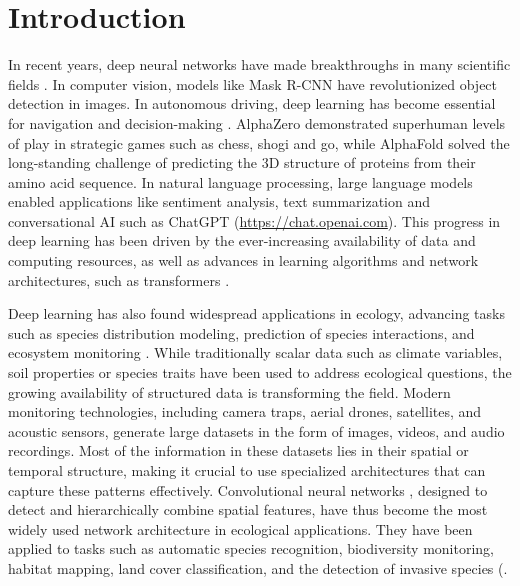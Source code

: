 \documentclass[12pt,twoside]{scrreport}
\begin{document}
\chapter*{Introduction}
\setcounter{page}{1}
In recent years, deep neural networks have made breakthroughs in many scientific fields \citep{jordanMachineLearningTrends2015}. In computer vision, models like Mask R-CNN \citep{heMaskRCNN2017} have revolutionized object detection in images. In autonomous driving, deep learning has become essential for navigation and decision-making \citep{bojarskiEndEndLearning2016}. AlphaZero \citep{silverMasteringChessShogi2017} demonstrated superhuman levels of play in strategic games such as chess, shogi and go, while AlphaFold \citep{jumperHighlyAccurateProtein2021} solved the long-standing challenge of predicting the 3D structure of proteins from their amino acid sequence. In natural language processing, large language models \citep[e.g., GPT-3,][]{brownLanguageModelsAre2020} enabled applications like sentiment analysis, text summarization and conversational AI such as ChatGPT (\url{https://chat.openai.com}). This progress in deep learning has been driven by the ever-increasing availability of data and computing resources, as well as advances in learning algorithms and network architectures, such as transformers \citep{vaswaniAttentionAllYou2017}.

Deep learning has also found widespread applications in ecology, advancing tasks such as species distribution modeling, prediction of species interactions, and ecosystem monitoring \citep{chenEndEndLearningDeep2018, wilkinsonComparisonJointSpecies2019, pichlerMachineLearningAlgorithms2020, pichlerMachineLearningDeep2023, borowiecDeepLearningTool2022, tuiaPerspectivesMachineLearning2022, christinApplicationsDeepLearning2019}. While traditionally scalar data such as climate variables, soil properties or species traits have been used to address ecological questions, the growing availability of structured data is transforming the field. Modern monitoring technologies, including camera traps, aerial drones, satellites, and acoustic sensors, generate large datasets in the form of images, videos, and audio recordings. Most of the information in these datasets lies in their spatial or temporal structure, making it crucial to use specialized architectures that can capture these patterns effectively. Convolutional neural networks \citep[CNNs,]{lecunBackpropagationAppliedHandwritten1989a}, designed to detect and hierarchically combine spatial features, have thus become the most widely used network architecture in ecological applications. They have been applied to tasks such as automatic species recognition, biodiversity monitoring, habitat mapping, land cover classification, and the detection of invasive species (\citep{gomezvillaAutomaticWildAnimal2017, norouzzadehAutomaticallyIdentifyingCounting2018, tabakMachineLearningClassify2019, salamonFusingShallowDeep2017, liDeepLearningRemote2018, kattenbornConvolutionalNeuralNetworks2019, qianUAVDeepConvolutional2020}.
\end{document}
